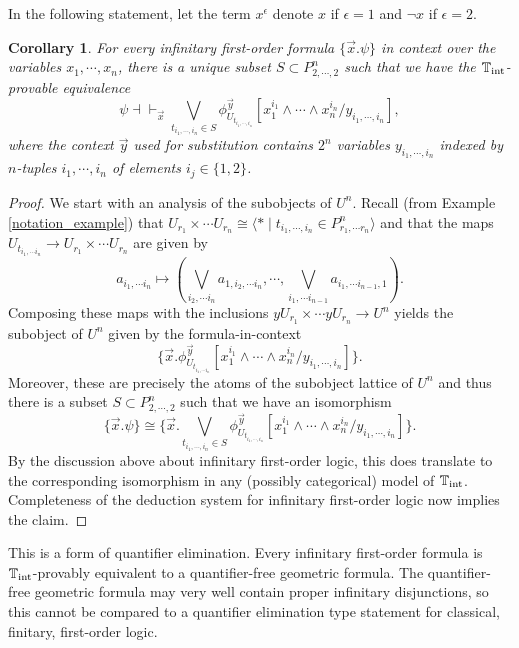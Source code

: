 \documentclass[a4paper]{amsproc}
\theoremstyle{plain}
\newtheorem{corollary}[theorem]{Corollary}
\theoremstyle{definition}
\theoremstyle{remark}
\numberwithin{equation}{section}
\newcommand{\y}{\textit{y}}
\begin{document}
In the following statement, let the term $x^{\epsilon}$ denote $x$ if $\epsilon = 1$ and $\neg x$ if $\epsilon = 2$.

\begin{corollary}\label{normal_form}
    For every infinitary first-order formula $\{\vec{x}. \psi\}$ in context over the variables $x_1,\cdots, x_n$, there is a unique subset $S \subset P^n_{2,\cdots,2}$ such that we have the $\mathbb{T}_{\textup{int}}$-provable equivalence
    \[
        \psi \dashv \vdash_{\vec{x}} \bigvee_{t_{i_1,\cdots,i_n} \in S} \phi^{\vec{y}}_{U_{t_{i_1,\cdots,i_n}}} [ x_1^{i_1} \wedge \cdots \wedge x_n^{i_n} / y_{i_1,\cdots, i_n}] ,
    \]
    where the context $\vec{y}$ used for substitution contains $2^n$ variables $y_{i_1,\cdots,i_n}$ indexed by $n$-tuples $i_1,\cdots,i_n$ of elements $i_j \in \{1,2\}$. 
\end{corollary}

\begin{proof}
    We start with an analysis of the subobjects of $U^n$. Recall (from Example \ref{notation_example}) that $U_{r_1} \times \cdots U_{r_n} \cong \langle * \mid t_{i_1,\cdots, i_n} \in P^n_{r_1,\cdots r_n} \rangle$ and that the maps $U_{t_{i_1,\cdots i_n}} \to U_{r_1} \times \cdots U_{r_n}$ are given by
    \[
        a_{i_1,\cdots i_n} \mapsto (\bigvee_{i_2,\cdots i_n} a_{1,i_2,\cdots i_n},\cdots, \bigvee_{i_1,\cdots i_{n - 1}} a_{i_1,\cdots i_{n - 1}, 1}) .
    \]
    Composing these maps with the inclusions $\y U_{r_1} \times \cdots \y U_{r_n} \to U^n$ yields the subobject of $U^n$ given by the formula-in-context
    \[
        \{ \vec{x} . \phi^{\vec{y}}_{U_{t_{i_1,\cdots i_n}}} [ x_1^{i_1} \wedge \cdots \wedge x_n^{i_n} / y_{i_1,\cdots, i_n}] \} .
    \]
    Moreover, these are precisely the atoms of the subobject lattice of $U^n$ and thus there is a subset $S \subset P^n_{2,\cdots,2}$ such that we have an isomorphism
    \[
        \{ \vec{x} . \psi \} \cong \{ \vec{x} . \bigvee_{t_{i_1,\cdots,i_n} \in S} \phi^{\vec{y}}_{U_{t_{i_1,\cdots,i_n}}} [ x_1^{i_1} \wedge \cdots \wedge x_n^{i_n} / y_{i_1,\cdots, i_n}] \} .
    \]
    By the discussion above about infinitary first-order logic, this does translate to the corresponding isomorphism in any (possibly categorical) model of $\mathbb{T}_{\textup{int}}$. Completeness of the deduction system for infinitary first-order logic now implies the claim.
\end{proof}

This is a form of quantifier elimination. Every infinitary first-order formula is $\mathbb{T}_{\textup{int}}$-provably equivalent to a quantifier-free geometric formula. The quantifier-free geometric formula may very well contain proper infinitary disjunctions, so this cannot be compared to a quantifier elimination type statement for classical, finitary, first-order logic.
\end{document}
